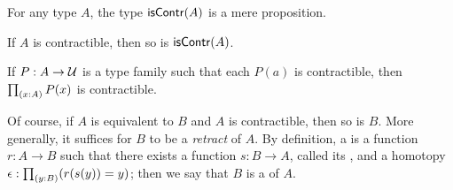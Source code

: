 \documentclass[hott-all.tex]{subfiles}
\begin{document}
\begin{lem}
  For any type $A$, the type $\mathsf{isContr}(A)$ is a mere proposition.
\end{lem}

\begin{cor}
  If $A$ is contractible, then so is $\mathsf{isContr}(A)$.
\end{cor}


\begin{lem}
  If $P:A\to\mathcal{U}$ is a type family such that each $P(a)$ is contractible, then $\prd{x:A} P(x)$ is contractible.
\end{lem}
%

Of course, if $A$ is equivalent to $B$ and $A$ is contractible, then so is $B$.
More generally, it suffices for $B$ to be a \emph{retract} of $A$.
By definition, a 
is a function $r : A \to B$ such that there exists a function $s : B \to A$, called its ,
and a homotopy $\epsilon:\prd{y:B} (r(s(y))=y)$; then we say that $B$ is a %
of $A$.
\end{document}
